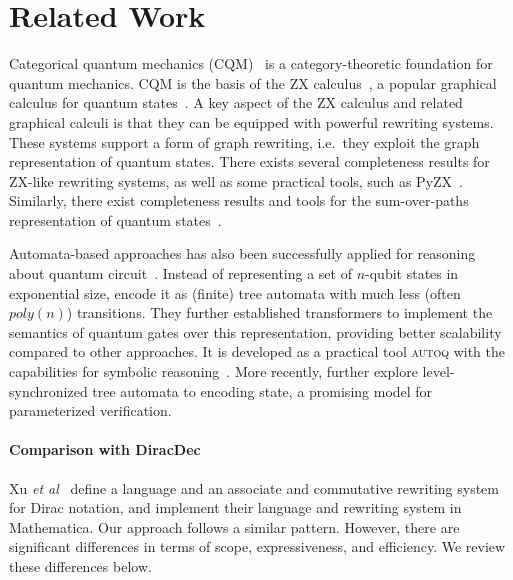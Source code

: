 \section{Related Work}
Categorical quantum mechanics (CQM)~\cite{DBLP:conf/lics/AbramskyC04}
is a category-theoretic foundation for quantum mechanics. CQM is the
basis of the ZX calculus~\cite{DBLP:conf/icalp/CoeckeD08}, a popular
graphical calculus for quantum states~\cite{vandewetering2020zx}. A
key aspect of the ZX calculus and related graphical calculi is that
they can be equipped with powerful rewriting systems. These systems
support a form of graph rewriting, i.e.\, they exploit the graph
representation of quantum states. There exists several completeness
results for ZX-like rewriting systems, as well as some practical
tools, such as PyZX~\cite{kissinger2019pyzx}. Similarly, there exist
completeness results and tools for the sum-over-paths representation
of quantum states~\cite{amy2018towards,amy2023complete}.

Automata-based approaches has also been successfully applied for reasoning about quantum circuit~\cite{AutoQ_pldi_2023}. Instead of representing a set of  $n$-qubit states in exponential size, \cite{AutoQ_pldi_2023} encode it as (finite) tree automata with much less (often $\mathit{poly}(n)$) transitions.  They further established transformers to implement the semantics of quantum gates over this representation, providing better scalability compared to other approaches. It is developed as a practical tool \textsc{autoq} with the capabilities for symbolic reasoning~\cite{AutoQ2023}. More recently, \cite{AutoQ_popl2025} further explore level-synchronized tree automata to encoding state, a promising model for parameterized verification.


\paragraph*{Comparison with DiracDec~\cite{diracdec}}
Xu \emph{et al}~\cite{diracdec} define a language and an associate and
commutative rewriting system for Dirac notation, and implement their
language and rewriting system in Mathematica. Our approach follows a
similar pattern. However, there are significant differences in terms
of scope, expressiveness, and efficiency. We review these differences
below.

